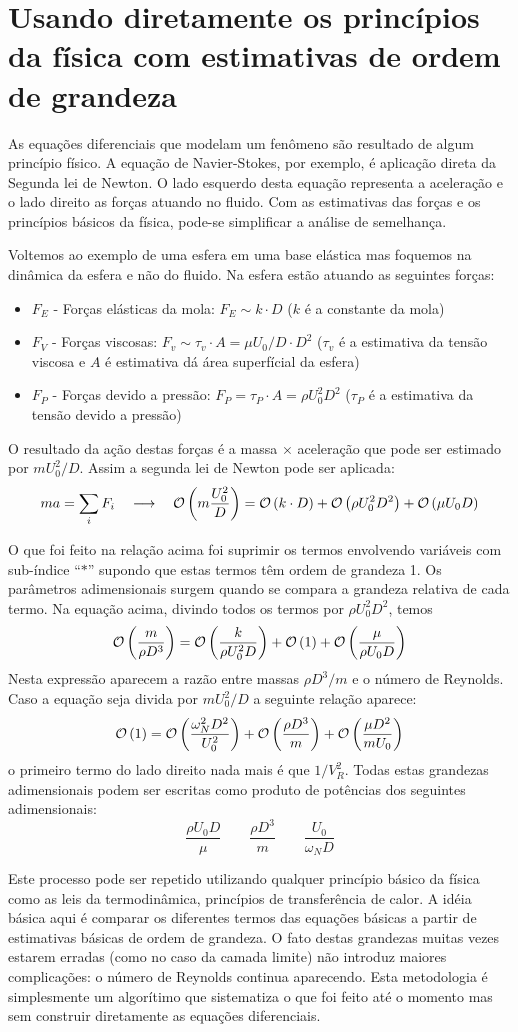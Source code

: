 \section{Usando diretamente os princípios da física com estimativas de ordem de grandeza}
As equações diferenciais que modelam um fenômeno são resultado de algum princípio físico. A equação de Navier-Stokes, por exemplo, é aplicação direta da Segunda lei de Newton. O lado esquerdo desta equação representa a aceleração e o lado direito as forças atuando no fluido. Com as estimativas das forças e os princípios básicos da física, pode-se simplificar a análise de semelhança. 

Voltemos ao exemplo de uma esfera em uma base elástica mas foquemos na dinâmica da esfera e não do fluido. Na esfera estão atuando as seguintes forças:
\begin{itemize}
\item $F_E$ - Forças elásticas da mola: $F_E \sim k\cdot D$ ($k$ é a constante da mola)
\item $F_V$ - Forças viscosas: $F_v \sim \tau_v \cdot A = \mu U_0/D \cdot D^2$ ($\tau_v$ é a estimativa da tensão viscosa e $A$ é estimativa dá área superfícial da esfera)
\item $F_P$ - Forças devido a pressão: $F_P = \tau_P \cdot A = \rho U_0^2 D^2$ ($\tau_P$ é a estimativa da tensão devido a pressão)
\end{itemize}
O resultado da ação destas forças é a massa $\times$ aceleração que pode ser estimado por $mU_0^2/D$. Assim a segunda lei de Newton pode ser aplicada:
\[
ma = \sum_i F_i \quad\longrightarrow\quad \mathcal{O}\left(m\frac{U_0^2}{D}\right) = \mathcal{O}\left(k\cdot D\right) + \mathcal{O}\left(\rho U_0^2 D^2\right) + \mathcal{O}\left(\mu U_0 D\right)
\]

O que foi feito na relação acima foi suprimir os termos envolvendo variáveis com sub-índice ``$*$'' supondo que estas termos têm ordem de grandeza 1. Os parâmetros adimensionais surgem quando se compara a grandeza relativa de cada termo. Na equação acima, divindo todos os termos por $\rho U_0^2 D^2$, temos
\[
\mathcal{O}\left(\frac{m}{\rho D^3}\right) = \mathcal{O}\left(\frac{k}{\rho U_0^2 D}\right) + \mathcal{O}\left(1\right) + \mathcal{O}\left(\frac{\mu}{\rho U_0 D}\right)
\]
Nesta expressão aparecem a razão entre massas $\rho D^3/m$ e o número de Reynolds. Caso a equação seja divida por $m U_0^2/D$ a seguinte relação aparece:
\[
\mathcal{O}\left(1\right) = \mathcal{O}\left(\frac{\omega_N^2 D^2}{U_0^2}\right) + \mathcal{O}\left(\frac{\rho D^3}{m}\right) + \mathcal{O}\left(\frac{\mu D^2}{m U_0}\right)
\]
o primeiro termo do lado direito nada mais é que $1/V_R^2$. Todas estas grandezas adimensionais podem ser escritas como produto de potências dos seguintes adimensionais:
\[
\frac{\rho U_0 D}{\mu} \qquad \frac{\rho D^3}{m} \qquad \frac{U_0}{\omega_N D}
\]

Este processo pode ser repetido utilizando qualquer princípio básico da física como as leis da termodinâmica, princípios de transferência de calor. A idéia básica aqui é comparar os diferentes termos das equações básicas a partir de estimativas básicas de ordem de grandeza. O fato destas grandezas muitas vezes estarem erradas (como no caso da camada limite) não introduz maiores complicações: o número de Reynolds continua aparecendo. Esta metodologia é simplesmente um algorítimo que sistematiza o que foi feito até o momento mas sem construir diretamente as equações diferenciais.


